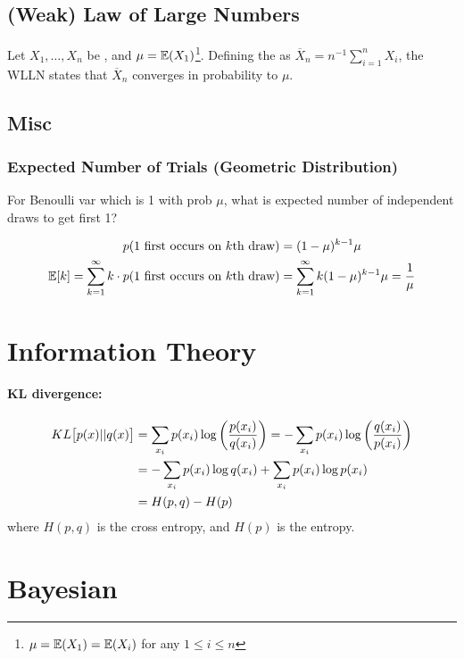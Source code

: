 \documentclass[11pt]{article}
\begin{document}
\subsection{(Weak) Law of Large Numbers}
Let $X_1, \dots, X_n$ be , and $\mu = \mathbb{E}(X_1)$\footnote{$\mu = \mathbb{E}(X_1) =
  \mathbb{E}(X_i)$ for any $1 \leq i \leq n$}. Defining the  as
$\overline{X}_n = n^{-1} \sum_{i=1}^n X_i$, the WLLN states that $\overline{X}_n$
converges in probability to $\mu$. 


\subsection{Misc}

\subsubsection{Expected Number of Trials (Geometric Distribution)}
For Benoulli var which is 1 with prob $\mu$, what is expected number of independent draws
to get first 1?

\begin{align}
  p(\textrm{1 first occurs on $k$th draw}) &= (1-\mu)^{k-1} \mu \nonumber\\
  \mathbb{E}[k] = \sum_{k=1}^{\infty} k \cdot p(\textrm{1 first occurs on $k$th draw}) &=
          \sum_{k=1}^{\infty} k (1-\mu)^{k-1} \mu = \frac{1}{\mu}
\end{align}




\section{Information Theory}
\paragraph{KL divergence:}
\begin{align}
  KL\big[p(x) || q(x)\big]
  &= \sum_{x_i} p(x_i) \log \left( \frac{p(x_i)}{q(x_i)} \right)
    = -\sum_{x_i} p(x_i) \log \left( \frac{q(x_i)}{p(x_i)} \right) \nonumber\\ 
  &= -\sum_{x_i} p(x_i) \log q(x_i) + \sum_{x_i} p(x_i) \log p(x_i) \nonumber\\ 
  &= H(p,q) - H(p)
\end{align}
where $H(p,q)$ is the cross entropy, and $H(p)$ is the entropy.



\section{Bayesian}
\end{document}
